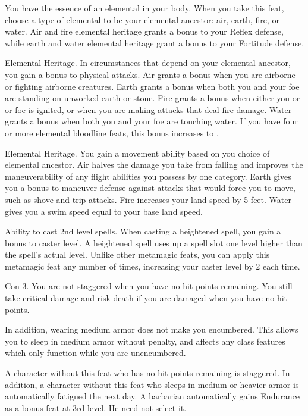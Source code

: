 \featben You have the essence of an elemental in your body. When you take this feat, choose a type of elemental to be your elemental ancestor: air, earth, fire, or water. Air and fire elemental heritage grants a  bonus to your Reflex defense, while earth and water elemental heritage grant a  bonus to your Fortitude defense.

\featpre Elemental Heritage.
\featben In circumstances that depend on your elemental ancestor, you gain a  bonus to physical attacks. Air grants a bonus when you are airborne or fighting airborne creatures. Earth grants a bonus when both you and your foe are standing on unworked earth or stone. Fire grants a bonus when either you or or foe is ignited, or when you are making attacks that deal fire damage. Water grants a bonus when both you and your foe are touching water. If you have four or more elemental bloodline feats, this bonus increases to .

\featpre Elemental Heritage.
\featben You gain a movement ability based on you choice of elemental ancestor. Air halves the damage you take from falling and improves the maneuverability of any flight abilities you possess by one category. Earth gives you a  bonus to maneuver defense against attacks that would force you to move, such as shove and trip attacks. Fire increases your land speed by 5 feet. Water gives you a swim speed equal to your base land speed.

 Ability to cast 2nd level spells.
 When casting a heightened spell, you gain a  bonus to caster level. A heightened spell uses up a spell slot one level higher than the spell's actual level. Unlike other metamagic feats, you can apply this metamagic feat any number of times, increasing your caster level by 2 each time.

\featpre Con 3.
 You are not staggered when you have no hit points remaining. You still take critical damage and risk death if you are damaged when you have no hit points.

In addition, wearing medium armor does not make you encumbered. This allows you to sleep in medium armor without penalty, and affects any class features which only function while you are unencumbered.

 A character without this feat who has no hit points remaining is staggered. In addition, a character without this feat who sleeps in medium or heavier armor is automatically fatigued the next day.
 A barbarian automatically gains Endurance as a bonus feat at 3rd level. He need not select it.

